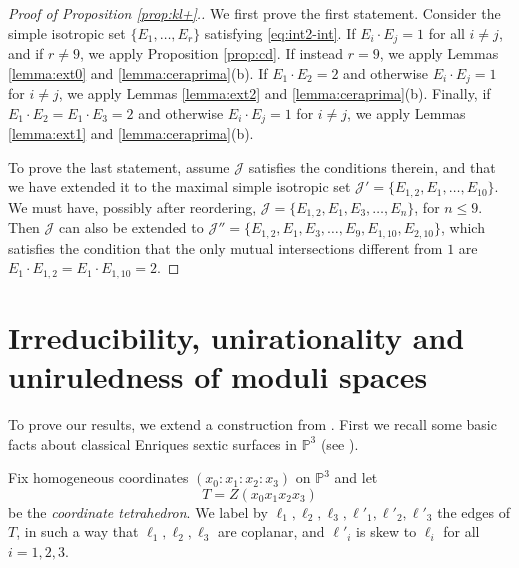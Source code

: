 \documentclass[11pt]{amsart}
\theoremstyle{definition}
\def\PP{{\mathbb P}}
\def\I{{\mathcal J}}
\renewcommand{\leq}{\leqslant}
\begin{document}
\begin{proof}[Proof of Proposition \ref {prop:kl+}.]  We first prove the first statement.  Consider the simple isotropic  set $\{E_1,\ldots,E_r\}$ satisfying \eqref {eq:int2-int}.  
If  $E_i\cdot E_j=1$  for all $i\neq j$, and if $r\neq 9$, we  apply  Proposition \ref {prop:cd}. If instead $r=9$, we  apply  Lemmas \ref {lemma:ext0} and \ref{lemma:ceraprima}(b).   If  
$E_1\cdot E_2=2$   and otherwise  $E_i\cdot E_j=1$   for $i\neq j$, we  apply  Lemmas \ref {lemma:ext2} and \ref{lemma:ceraprima}(b).   Finally, if  $E_1\cdot E_2=E_1\cdot E_3=2$  and otherwise  $E_i\cdot E_j=1$  for $i\neq j$, we apply  Lemmas \ref {lemma:ext1} and \ref{lemma:ceraprima}(b). 

 To prove the last statement, assume $\I$ satisfies the conditions therein, and that we have extended it to the maximal simple isotropic set $\I'=\{E_{1,2},E_1,\ldots, E_{10}\}$. We must have, possibly after reordering,
$\I=\{E_{1,2},E_1,E_3,\ldots,E_n\}$, for $n \leq 9$. Then $\I$ can also be extended to $\I''=\{E_{1,2},E_1,E_3,\ldots,E_9,E_{1,10},E_{2,10}\}$, which satisfies the condition that the only mutual intersections different from $1$ are $E_1 \cdot E_{1,2}=E_1 \cdot E_{1,10}=2$. 
\end{proof}
















 
\section{Irreducibility,  unirationality and uniruledness of moduli spaces} \label{sec:bas0}





 To prove our results, we  extend a construction from \cite{Ve}. First we recall some basic facts about classical Enriques sextic surfaces in $\PP^ 3$ (see \cite {cd}). 

Fix homogeneous coordinates $(x_0:x_1:x_2:x_3)$ on $\PP^3$ and let
\[T =Z(x_0x_1x_2x_3)\]
 be the  \emph{coordinate tetrahedron}.
 We label by
$\ell_1,\ell_2,\ell_3,\ell'_1,\ell'_2,\ell'_3$ the edges of $T$, in
such a way that $\ell_1,\ell_2,\ell_3$ are coplanar, and $\ell'_i$ is
skew to $\ell_i$ for all $i=1,2,3$. 
\end{document}
